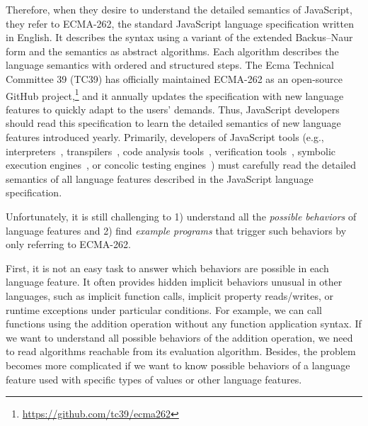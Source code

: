 Therefore, when they desire to understand the detailed semantics of JavaScript,
they refer to ECMA-262, the standard JavaScript language specification written
in English.  It describes the syntax using a variant of the extended Backus–Naur
form and the semantics as abstract algorithms.  Each algorithm describes the
language semantics with ordered and structured steps.  The Ecma Technical
Committee 39 (TC39) has officially maintained ECMA-262 as an open-source GitHub
project,\footnote{\url{https://github.com/tc39/ecma262}} and it annually updates
the specification with new language features to quickly adapt to the users'
demands.  Thus, JavaScript developers should read this specification
to learn the detailed semantics of new language features introduced yearly.
Primarily, developers of JavaScript tools (e.g.,
interpreters~\cite{v8, jscore, spidermonkey, graaljs},
transpilers~\cite{babel},
code analysis tools~\cite{safe, safe2, tajs, wala, jsai},
verification tools~\cite{javert, javert2, ad-safety, javanni},
symbolic execution engines~\cite{symbolic-js, sym-js, expo-se},
or concolic testing engines~\cite{jalangi, type-conc-test})
must carefully read the detailed semantics of all language features described in
the JavaScript language specification.

Unfortunately, it is still challenging to 1) understand all the \textit{possible
behaviors} of language features and 2) find \textit{example programs} that
trigger such behaviors by only referring to ECMA-262.

First, it is not an easy task to answer which behaviors are possible in each
language feature.  It often provides hidden implicit behaviors unusual in other
languages, such as implicit function calls, implicit property reads/writes, or
runtime exceptions under particular conditions.  For example, we can call functions
using the addition operation without any function application syntax.  If
we want to understand all possible behaviors of the addition operation, we need
to read  algorithms reachable from its evaluation algorithm.
Besides, the problem becomes more complicated if we want to know possible
behaviors of a language feature used with specific types of values or other
language features.

